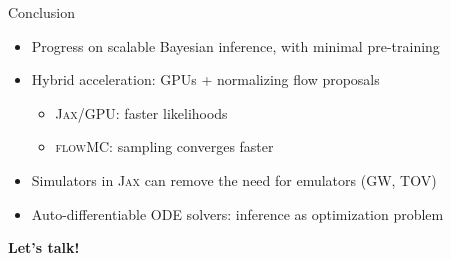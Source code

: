 \documentclass[usenames,dvipsnames,t]{beamer}
\begin{document}
\begin{frame}{Conclusion}
  \def\x{4mm}
  \def\y{1mm}

  \begin{itemize}
    \item Progress on scalable Bayesian inference, with minimal pre-training
 
    \vspace{\x}

    \item Hybrid acceleration: GPUs + normalizing flow proposals
    \begin{itemize}
      \vspace{\y}
      \item \textsc{Jax}/GPU: faster likelihoods

      \vspace{\y}

      \item \textsc{flowMC}: sampling converges faster
    \end{itemize}

    \vspace{\x}

    \item Simulators in \textsc{Jax} can remove the need for emulators (GW, TOV)

    \vspace{\x}

    \item Auto-differentiable ODE solvers: inference as optimization problem
  \end{itemize}
  
  \vspace{8mm}

  \textbf{Let's talk!}
\end{frame}
\end{document}

